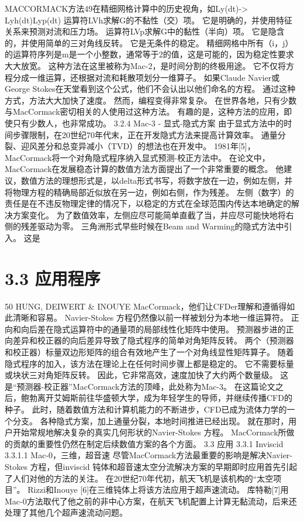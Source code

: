 \documentclass[UTF8,11pt,a4paper,openany,fontset=fandol]{ctexbook}
\begin{document}
MACCORMACK方法49在精细网格计算中的历史视角，如Ly(dt)-> Lyh(dt)Lyp(dt) 运算符LVh求解G的不黏性（交）项。 它是明确的，并使用特征关系来预测对流和压力场。 运算符LVp求解G中的黏性（半向）项。 它是隐含的，并使用简单的三对角线反转。 它是无条件的稳定。 精细网格中所有（i，j）的运算符序列是m是一个小整数，通常等于2的值，这是可能的，因为稳定性要求大大放宽。 这种方法在这里被称为Mac-2，是时间分割的终极用途。 它不仅将方程分成一维运算，还根据对流和耗散项划分一维算子。 如果Claude Navier或George Stokes在天堂看到这个公式，他们不会认出以他们命名的方程。 通过这种方式，方法大大加快了速度。 然而，编程变得非常复杂。 在世界各地，只有少数与MacCormack密切相关的人使用过这种方法。 有趣的是，这种方法的应用，即使只有少数人，也非常成功。 3.2.4 Mac-3 - 显式-隐式方案 由于显式方法中的时间步骤限制，在20世纪70年代末，正在开发隐式方法来提高计算效率。 通量分裂、迎风差分和总变异减小（TVD）的想法也在开发中。 1981年[5]，MacCormack将一个对角隐式程序纳入显式预测-校正方法中。 在论文中，MacCormack在发展稳态计算的数值方法方面提出了一个非常重要的概念。 他建议，数值方法的理想形式是，以delta形式书写，将数字放在一边，例如左侧，并将物理方程的精确局部近似放在另一边，例如右侧，作为残差。 左侧（数字）的责任是在不违反物理定律的情况下，以稳定的方式在全球范围内传达本地确定的解决方案变化。 为了数值效率，左侧应尽可能简单直截了当，并应尽可能快地将右侧的残差驱动为零。 三角洲形式早些时候在Beam and Warming的隐式方法中引入。 这是

\section{3.3 应用程序}
50 HUNG, DEIWERT \& INOUYE MacCormack，他们让CFDer理解和遵循得如此清晰和容易。 Navier-Stokes 方程仍然像以前一样被划分为本地一维运算符。 正向和向后差在隐式运算符中的通量项的局部线性化矩阵中使用。 预测器步进的正向差异和校正器的向后差异导致了隐式程序的简单对角矩阵反转。 两个（预测器和校正器）标量双边形矩阵的组合有效地产生了一个对角线显性矩阵算子。 随着隐式程序的加入，该方法在理论上在任何时间步骤上都是稳定的。 它不需要标量或块状三对角矩阵反转。 因此，它非常高效，速度加快了大约两个数量级。 这是“预测器-校正器”MacCormack方法的顶峰，此处称为Mac-3。 在这篇论文之后，鲍勃离开艾姆斯前往华盛顿大学，成为年轻学生的导师，并继续传播CFD的种子。 此时，随着数值方法和计算机能力的不断进步，CFD已成为流体力学的一个分支。 各种隐式方案，加上通量分裂，本地时间推进已经出现。 就在那时，用户开始常规地解决复杂的真实几何形状的Navier-Stokes 方程。 MacCormack所做的贡献的重要性仍然在制定后续数值方案的各个方面。 3.3 应用 3.3.1 Inviscid 3.3.1.1 Mac-0，三维，超音速 尽管MacCormack方法最重要的影响是解决Navier-Stokes 方程，但inviscid 钝体和超音速太空分流解决方案的早期即时应用首先引起了人们对他的方法的关注。 在20世纪70年代初，航天飞机是该机构的“太空项目”。 Rizzi和Inouye [6]在三维钝体上将该方法应用于超声速流动。 库特勒[7]用Mac-0方法取代了他之前的非中心方案，在航天飞机配置上计算无黏流动，后来还处理了其他几个超声速流动问题。
\end{document}
